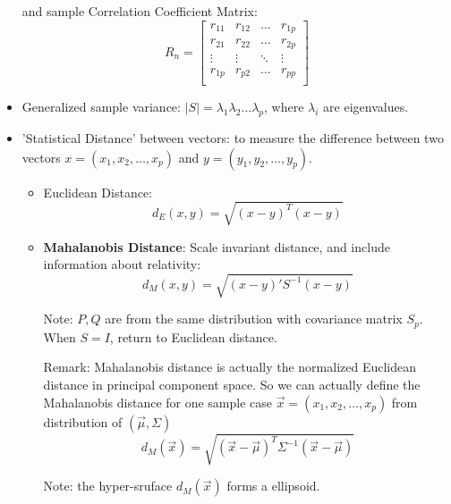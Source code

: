 \begin{itemize}[topsep=6pt,itemsep=4pt]
        and sample Correlation Coefficient Matrix:
        \begin{equation}
            R_n=
            \begin{bmatrix}
            r_{11}&r_{12}&\ldots&r_{1p}\\
            r_{21}&r_{22}&\ldots&r_{2p}\\
            \vdots&\vdots&\ddots&\vdots\\
            r_{1p}&r_{p2}&\ldots&r_{pp}\\
            \end{bmatrix}
        \end{equation}
        \item Generalized sample variance: $ |S|=\lambda _1\lambda _2 \ldots \lambda _p$, where $ \lambda_i  $ are eigenvalues.
        
        \item 'Statistical Distance' between vectors: to measure the difference between two vectors $ x=(x_1,x_2,\ldots,x_p) $ and $ y=(y_1,y_2,\ldots,y_p) $.
        \begin{itemize}[topsep=6pt,itemsep=4pt]
            \item Euclidean Distance:
            \begin{equation}
                d_E(x,y) =\sqrt{(x-y)^T(x-y)}
            \end{equation}
            \item \textbf{Mahalanobis Distance}: Scale invariant distance, and include information about relativity:
            \begin{equation}
                d_M(x,y)=\sqrt{(x-y)'S^{-1}(x-y)} 
            \end{equation}

            Note: $ P,Q $ are from the same distribution with covariance matrix $ S_p $. When $ S=I $, return to Euclidean distance.
            
            Remark: Mahalanobis distance is actually the normalized Euclidean distance in principal component space. So we can actually define the Mahalanobis distance for one sample case $ \vec{x}=(x_1,x_2,\ldots ,x_p) $ from distribution of $ (\vec{\mu},\Sigma)  $
            \begin{equation}\label{MahalanobisDistance}
                d_M(\vec{x})=\sqrt{(\vec{x}-\vec{\mu})^T\Sigma ^{-1}(\vec{x}-\vec{\mu})} 
            \end{equation}

            Note: the hyper-sruface $ d_M(\vec{x}) $ forms a ellipsoid.

        \end{itemize}
    \end{itemize}

